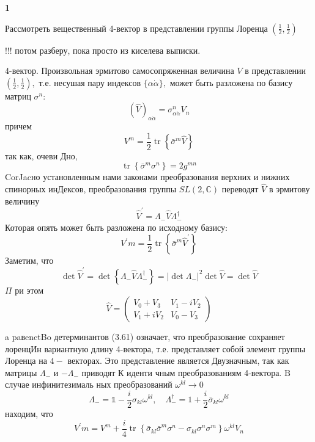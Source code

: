 \documentclass[a4paper,12pt]{article} %
\begin{document}
\begin{task}\textbf{1}

Рассмотреть вещественный 4-вектор в представлении группы Лоренца $\left(\frac{1}{2}, \frac{1}{2}\right)$


!!! потом разберу, пока просто из киселева выписки.

4-вектор. Произвольная эрмитово самосопряженная величина $V$ в представлении $\left(\frac{1}{2}, \frac{1}{2}\right),$ т.е. несушая пару индексов $\{\alpha \dot{\alpha}\},$ может быть разложена по базису матриц $\sigma^{n}:$
$$
(\hat{V})_{\alpha \dot{\alpha}}=\sigma_{\alpha \dot{\alpha}}^{n} V_{n}
$$
причем
$$
V^{m}=\frac{1}{2} \operatorname{tr}\left\{\bar{\sigma}^{m} \hat{V}\right\}
$$
так как, очеви Дно,
$$
\operatorname{tr}\left\{\bar{\sigma}^{m} \sigma^{n}\right\}=2 g^{m n}
$$
CorJacно установленным нами законами преобразования верхних и нижних спинорных инДексов, преобразования группы $S L(2, \mathbb{C})$ переводят $\hat{V}$ в эрмитову величину
$$
\hat{V}^{\prime}=\Lambda_{-} \hat{V} \Lambda_{-}^{\dagger}
$$
Которая опять может быть разложена по исходному базису:
$$
V^{\prime} m=\frac{1}{2} \operatorname{tr}\left\{\bar{\sigma}^{m} \hat{V}^{\prime}\right\}
$$
Заметим, что
$$
\operatorname{det} \hat{V}^{\prime}=\operatorname{det}\left\{\Lambda_{-} \hat{V} \Lambda_{-}^{\dagger}\right\}=\left|\operatorname{det} \Lambda_{-}\right|^{2} \operatorname{det} \hat{V}=\operatorname{det} \hat{V}
$$
$\Pi$ ри этом
$$
\hat{V}=\left(\begin{array}{cc}
	V_{0}+V_{3} & V_{1}-i V_{2} \\
	V_{1}+i V_{2} & V_{0}-V_{3}
\end{array}\right)
$$


a paвenctBo детерминантов (3.61) означает, что преобразование сохраняет лоренцИн вариантную длину 4-вектора, т.е. представляет собой элемент группы Лоренца на $4-$ векторах. Это представление является Двузначным, так как матрицы $\Lambda_{-}$ и $-\Lambda_{-}$ приводят К иденти чным преобразованиям 4-вектора. $\mathrm{B}$ случае инфинитезималь ных преобразований $\omega^{k l} \rightarrow 0$
$$
\Lambda_{-}=\mathbb{1}-\frac{i}{2} \sigma_{k l} \omega^{k l}, \quad \Lambda_{-}^{\dagger}=1+\frac{i}{2} \bar{\sigma}_{k l} \omega^{k l}
$$
находим, что
$$
V^{\prime} m=V^{m}+\frac{i}{4} \operatorname{tr}\left\{\bar{\sigma}_{k l} \bar{\sigma}^{m} \sigma^{n}-\sigma_{k l} \sigma^{n} \sigma^{m}\right\} \omega^{k l} V_{n}
$$








\end{task}
\end{document}
